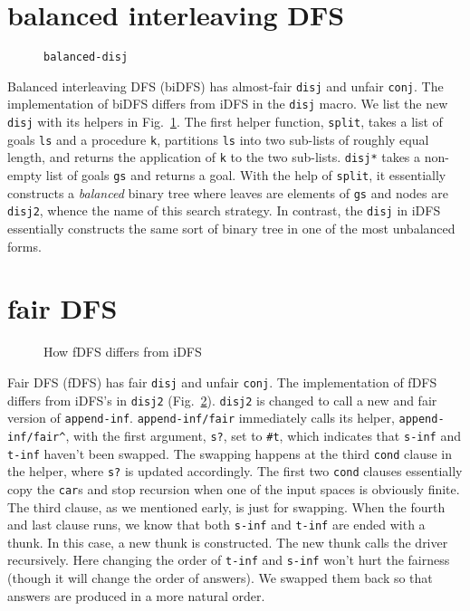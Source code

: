 \documentclass[format=acmlarge, review=true, authordraft=true]{acmart}
\newcommand{\conj}{\texttt{conj}}
\newcommand{\disj}{\texttt{disj}}
\begin{document}
\begin{center}
	\begin{tabular}{c}
		
	\end{tabular}
\end{center}
 
\section{balanced interleaving DFS}

\begin{figure}
	
	\caption{\texttt{balanced-disj}}
	\label{balanced-disj}
\end{figure}

Balanced interleaving DFS (biDFS) has almost-fair \disj{} and unfair \conj{}. 
The implementation of biDFS differs from iDFS in the \disj{} macro. We list the 
new \disj{} with its helpers in Fig.~\ref{balanced-disj}. The first helper 
function, \texttt{split}, takes a list of goals \texttt{ls} and a procedure 
\texttt{k}, partitions \texttt{ls} into two sub-lists of roughly equal length, 
and returns the application of \texttt{k} to the two sub-lists. \texttt{disj*} 
takes a non-empty list of goals \texttt{gs} and returns a goal. With the help 
of \texttt{split}, it essentially constructs a \emph{balanced} binary tree 
where leaves are elements of \texttt{gs} and nodes are \texttt{disj2}, whence 
the name of this search strategy. In contrast, the \disj{} in iDFS essentially 
constructs the same sort of binary tree in one of the most unbalanced forms.

\section{fair DFS}

\begin{figure}
	
	\caption{How fDFS differs from iDFS}
	\label{fDFS}
\end{figure}

Fair DFS (fDFS) has fair \disj{} and unfair \conj{}. The implementation of fDFS 
differs from iDFS's in \texttt{disj2} (Fig.~\ref{fDFS}). \texttt{disj2} is 
changed to call a new and fair version of \texttt{append-inf}. 
\texttt{append-inf/fair} immediately calls its helper, 
\texttt{append-inf/fair\^{}}, with the first argument, \texttt{s?}, set to 
\texttt{\#{}t}, which indicates that \texttt{s-inf} and \texttt{t-inf} haven't 
been swapped. The swapping happens at the third \texttt{cond} clause in the 
helper, where \texttt{s?} is updated accordingly. The first two \texttt{cond} 
clauses essentially copy the \texttt{car}s and stop recursion when one of the 
input spaces is obviously finite. The third clause, as we mentioned early, is 
just for swapping. When the fourth and last clause runs, we know that both 
\texttt{s-inf} and \texttt{t-inf} are ended with a thunk. In this case, a new 
thunk is constructed. The new thunk calls the driver recursively. Here changing 
the order of \texttt{t-inf} and \texttt{s-inf} won't hurt the fairness (though 
it will change the order of answers). We swapped them back so that answers are 
produced in a more natural order.
\end{document}
